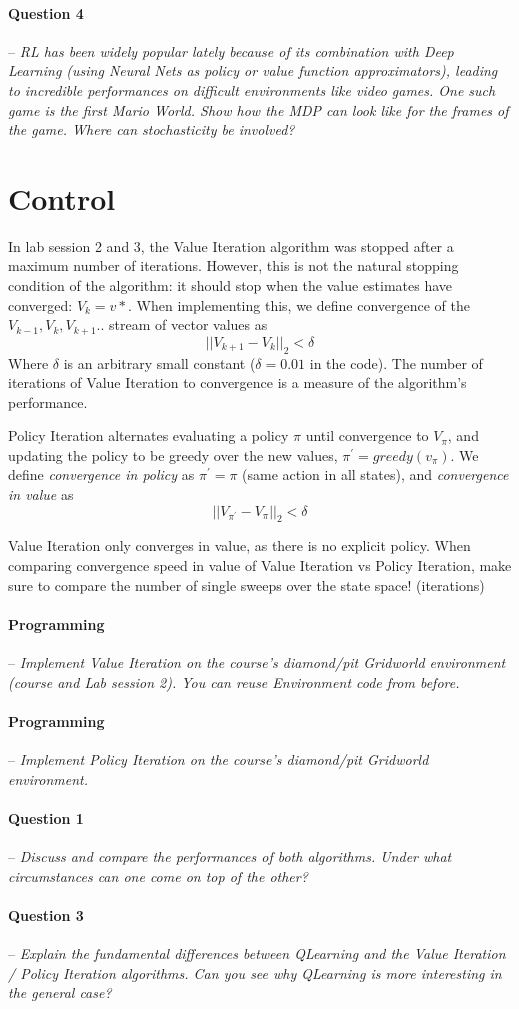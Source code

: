 \documentclass[a4paper]{article}
\newcommand{\question}[2]{
\paragraph{Question #1} -- \textit{#2}

}
\newcommand{\programming}[1]{
\paragraph{Programming} -- \textit{#1}

}
\begin{document}
		\question{4}{RL has been widely popular lately because of its combination with Deep Learning (using Neural Nets as policy or value function approximators), leading to incredible performances on difficult environments like video games. 
				One such game is the first Mario World. 
				Show how the MDP can look like for the frames of the game. 
				Where can stochasticity be involved?}


	\section{Control}
		In lab session 2 and 3, the Value Iteration algorithm was stopped after a maximum number of iterations. 
		However, this is not the natural stopping condition of the algorithm: it should stop when the value estimates have converged: $V_k = v*$. 
		When implementing this, we define convergence of the $V_{k-1},V_k,V_{k+1}..$ stream of vector values as $$ \vert\vert V_{k+1} - V_k \vert\vert_2 < \delta $$
		Where $\delta$ is an arbitrary small constant ($\delta = 0.01$ in the code). 
		The number of iterations of Value Iteration to convergence is a measure of the algorithm's performance.

		Policy Iteration alternates evaluating a policy $\pi$ until convergence to $V_\pi$, and updating the policy to be greedy over the new values, $\pi ^\prime = greedy(v_\pi)$. 
		We define \textit{convergence in policy} as  $\pi^\prime = \pi$ (same action in all states), and \textit{convergence in value} as $$ \vert\vert V_{\pi ^\prime} - V_\pi \vert\vert_2 < \delta $$

		Value Iteration only converges in value, as there is no explicit policy. 
		When comparing convergence speed in value of Value Iteration vs Policy Iteration, make sure to compare the number of single sweeps over the state space! (iterations)

		\programming{Implement Value Iteration on the course's diamond/pit Gridworld environment (course and Lab session 2). 
				You can reuse Environment code from before.}

		\programming{Implement Policy Iteration on the course's diamond/pit Gridworld environment.}

		\question{1}{Discuss and compare the performances of both algorithms. 
				Under what circumstances can one come on top of the other?}

		\question{3}{Explain the fundamental differences between QLearning and the Value Iteration / Policy Iteration algorithms. 
				Can you see why QLearning is more interesting in the general case?}
\end{document}
